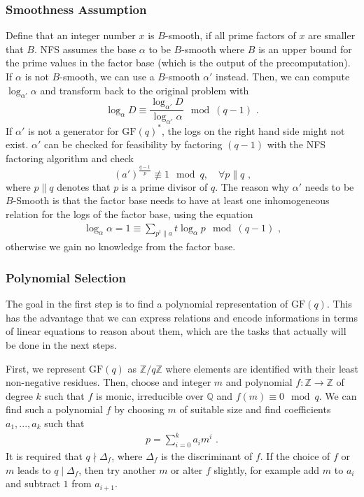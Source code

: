 \documentclass[paper=a4, fontsize=11pt]{scrartcl} %
\numberwithin{equation}{section} %
\numberwithin{figure}{section} %
\numberwithin{table}{section} %
\begin{document}
\subsubsection{Smoothness Assumption}
Define that an integer number $x$ is $B$-smooth, if all prime factors of $x$ are smaller that $B$. NFS assumes the base $\alpha$ to be $B$-smooth where $B$ is an upper bound for the prime values in the factor base (which is the output of the precomputation). If $\alpha$ is not $B$-smooth, we can use a $B$-smooth $\alpha'$ instead. Then, we can compute $\log_{\alpha'}\alpha$ and transform back to the original problem with
\begin{equation}
\log_\alpha D\equiv\frac{\log_{\alpha'}D}{\log_{\alpha'}\alpha}\mod (q-1)
\text{ .}
\end{equation}
If $\alpha'$ is not a generator for $\mathrm{GF}(q)^*$, the logs on the right hand side might not exist. $\alpha'$ can be checked for feasibility by factoring $(q-1)$ with the NFS factoring algorithm and check
\begin{equation}
(a')^{\frac{q-1}{p}} \not\equiv 1 \mod q,\quad\forall p\parallel q
\text{ ,}
\end{equation}
where $p\parallel q$ denotes that $p$ is a prime divisor of $q$. The reason why $\alpha'$ needs to be $B$-Smooth is that the factor base needs to have at least one inhomogeneous relation for the logs of the factor base, using the equation
\begin{eqnarray}
\label{eqn:assumption}
\log_\alpha\alpha = 1 \equiv \sum_{p^t\parallel a}t\log_\alpha p \mod (q-1)
\text{ ,}
\end{eqnarray}
otherwise we gain no knowledge from the factor base.

\subsubsection{Polynomial Selection}
The goal in the first step is to find a polynomial representation of $\mathrm{GF}(q)$. This has the advantage that we can express relations and encode informations in terms of linear equations to reason about them, which are the tasks that actually will be done in the next steps.

First, we represent $\mathrm{GF}(q)$ as $\mathbb{Z}/q\mathbb{Z}$ where elements are identified with their least non-negative residues. Then, choose and integer $m$ and polynomial $f:\mathbb{Z}\rightarrow\mathbb{Z}$ of degree $k$ such that $f$ is monic, irreducible over $\mathbb{Q}$ and $f(m)\equiv 0 \mod q$. We can find such a polynomial $f$ by choosing $m$ of suitable size and find coefficients $a_1,...,a_k$ such that
\begin{eqnarray}
p = \sum_{i=0}^{k}a_im^i
\text{ .}
\end{eqnarray}
It is required that $q\nmid\Delta_f$, where $\Delta_f$ is the discriminant of $f$. If the choice of $f$ or $m$ leads to $q\mid\Delta_f$, then try another $m$ or alter $f$ slightly, for example add $m$ to $a_i$ and subtract $1$ from $a_{i+1}$.
\end{document}
